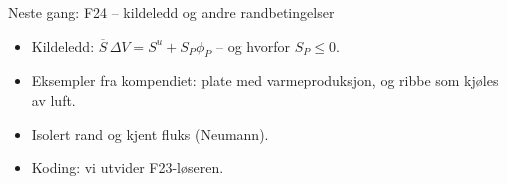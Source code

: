 \documentclass[11pt,aspectratio=169]{beamer}
\begin{document}
\begin{frame}{Neste gang: F24 -- kildeledd og andre randbetingelser}
\begin{nestefb}
\begin{itemize}
\item Kildeledd: $\overline S\,\Delta V = S^u + S_P\phi_P$ -- og hvorfor $S_P\le 0$.
\item Eksempler fra kompendiet: plate med varmeproduksjon, og ribbe som kjøles av luft.
\item Isolert rand og kjent fluks (Neumann).
\item Koding: vi utvider F23-løseren.
\end{itemize}
\end{nestefb}
\end{frame}
\end{document}
